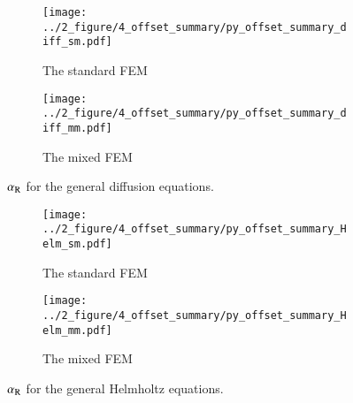 \documentclass[review,3p]{elsarticle}
\begin{document}
\newpage
\begin{figure}[!ht]
	\centering
    \begin{subfigure}{6.0cm}
        \texttt{[image: ../2\_figure/4\_offset\_summary/py\_offset\_summary\_diff\_sm.pdf]}
        \caption{The standard FEM}
        \label{py_offset_summary_diff_sm}
    \end{subfigure}
    \hspace{-0.2cm}
    \begin{subfigure}{6.0cm}
        \texttt{[image: ../2\_figure/4\_offset\_summary/py\_offset\_summary\_diff\_mm.pdf]}
        \caption{The mixed FEM}
        \label{py_offset_summary_diff_mm}
    \end{subfigure}
\caption{$\alpha_{\rm R}$ for the general diffusion equations.}
\label{py_offset_summary_diff}
\end{figure}

\begin{figure}[!ht]
	\centering
    \begin{subfigure}{6.0cm}
        \texttt{[image: ../2\_figure/4\_offset\_summary/py\_offset\_summary\_Helm\_sm.pdf]}
        \caption{The standard FEM}
        \label{py_offset_summary_Helm_sm}
    \end{subfigure}
    \hspace{-0.2cm}
    \begin{subfigure}{6.0cm}
        \texttt{[image: ../2\_figure/4\_offset\_summary/py\_offset\_summary\_Helm\_mm.pdf]}
        \caption{The mixed FEM}
        \label{py_offset_summary_Helm_mm}
    \end{subfigure}
\caption{$\alpha_{\rm R}$ for the general Helmholtz equations.}
\label{py_offset_summary_Helm}
\end{figure}
\end{document}
